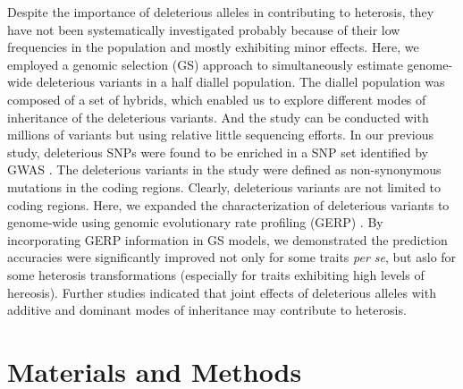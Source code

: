 \documentclass[9pt,twocolumn,twoside]{gsajnl}
\begin{document}
Despite the importance of deleterious alleles in contributing to heterosis, they have not been systematically investigated probably because of their low frequencies in the population and mostly exhibiting minor effects. Here, we employed a genomic selection (GS) approach to simultaneously estimate genome-wide deleterious variants in a half diallel population. The diallel population was composed of a set of hybrids, which enabled us to explore different modes of inheritance of the deleterious variants. And the study can be conducted with millions of variants but using relative little sequencing efforts. In our previous study, deleterious SNPs were found to be enriched in a SNP set identified by GWAS \citep{Mezmouk2014}. The deleterious variants in the study were defined as non-synonymous mutations in the coding regions. Clearly, deleterious variants are not limited to coding regions. Here, we expanded the characterization of deleterious variants to genome-wide using genomic evolutionary rate profiling (GERP) \citep{Cooper2005}. By incorporating GERP information in GS models, we demonstrated the prediction accuracies were significantly improved not only for some traits \emph{per se}, but aslo for some heterosis transformations (especially for traits exhibiting high levels of hereosis). Further studies indicated that joint effects of deleterious alleles with additive and dominant modes of inheritance may contribute to heterosis.


\section*{Materials and Methods} 
\end{document}

